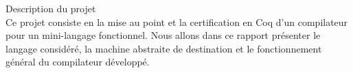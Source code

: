\documentclass[a4paper,twoside,12pt]{article}
\begin{document}
%

\setcounter{page}{1}

\clearpage

\tableofcontents

\clearpage

\begin{intro}

\begin{paragraph}{Description du projet\vspace{0.2cm}\\}
Ce projet consiste en la mise au point et la certification en Coq d'un compilateur pour un mini-langage fonctionnel. Nous allons dans ce rapport présenter le langage considéré, la machine abstraite de destination et le fonctionnement général du compilateur développé.
\end{paragraph}

\end{intro}
\end{document}
